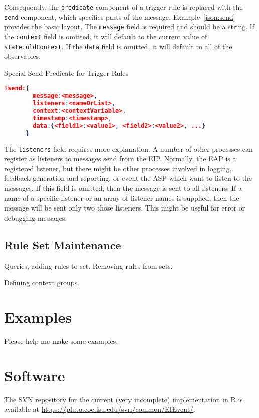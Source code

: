 \documentclass{article}
\begin{document}
  Consequently, the \texttt{predicate} component of a trigger rule is
  replaced with the \texttt{send} component, which specifies parts of
  the message.  Example~\ref{json:send} provides the basic layout.
  The \texttt{message} field is required and should be a string.  If
  the \texttt{context} field is omitted, it will default to the
  current value of \texttt{state.oldContext}.  If the \texttt{data}
  field is omitted, it will default to all of the observables.

  \begin{algorithm}
    \caption{Special Send Predicate for Trigger Rules}
    \label{json:send}
    \begin{lstlisting}[language=json]
      !send:{
        message:<message>,
        listeners:<nameOrList>,
        context:<contextVariable>,
        timestamp:<timestamp>,
        data:{<field1>:<value1>, <field2>:<value2>, ...}
      }
    \end{lstlisting}
  \end{algorithm}

  The \texttt{listeners} field requires more explanation.  A number of
  other processes can register as listeners to messages send from the
  EIP.  Normally, the EAP is a registered listener, but there might be
  other processes involved in logging, feedback generation and
  reporting, or event the ASP which want to listen to the messages.
  If this field is omitted, then the message is sent to all
  listeners.  If a name of a specific listener or an array of listener
  names is supplied, then the message will be sent only two those
  listeners.  This might be useful for error or debugging messages.

  \subsection{Rule Set Maintenance}
  \label{sub:ruleSet}

  Queries, adding rules to set.  Removing rules from sets.

  Defining context groups.

  \section{Examples}
  \label{sec:examples}

  Please help me make some examples.
  
  \section{Software}
  \label{sec:software}

  The SVN repository for the current (very incomplete) implementation
  in R is available at
  \url{https://pluto.coe.fsu.edu/svn/common/EIEvent/}.

  
  
  
\end{document}
